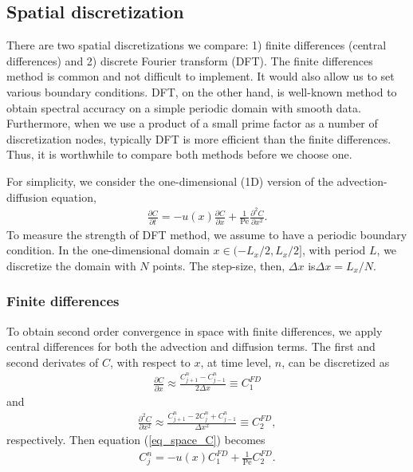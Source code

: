 \subsection{Spatial discretization}
There are two spatial discretizations we compare: 1) finite differences (central differences) and 2) discrete Fourier transform (DFT). The finite differences method is common and not difficult to implement. 
It would also allow us to set various boundary conditions. DFT, on the other hand, is well-known method to obtain spectral accuracy on a simple periodic domain with smooth data. Furthermore, when we use a product of a small prime factor as a number of discretization nodes, typically DFT is more efficient than the finite differences. Thus, it is worthwhile to compare both methods before we choose one. 
\par
For simplicity, we consider the one-dimensional (1D) version of the advection-diffusion equation,
\begin{align}
	\frac{\partial C}{\partial t} = 
	- u(x) \frac{\partial C}{\partial x} 
	+ \frac{1}{\text{Pe}} \frac{\partial^2 C}{\partial x^2}.
	\label{eq_space_C}
\end{align}
To measure the strength of DFT method, we assume to have a periodic boundary condition. In the one-dimensional domain $x \in (-L_x/2, L_x/2]$, with period $L$, we discretize the domain with $N$ points. The step-size, then, $\Delta x$ is$ \Delta x = L_x/N$.
\subsubsection{Finite differences}
To obtain second order convergence in space with finite differences, we apply  central differences for both the advection and diffusion terms. The first and second derivates of $C$, with respect to $x$, at time level, $n$, can be discretized as \cite{olver_introduction_2014}
\begin{align}
	\frac{\partial C}{\partial x}  \approx
	 \frac{C_{j+1}^{n} - C_{ j-1}^{n}}{2 \Delta x}
	 \equiv C_1^{FD}
	 \label{eq_c1_fd}
\end{align}
and
\begin{align}
	 \frac{\partial^2 C}{\partial x^2} \approx
	 \frac{C_{ j+1}^n -2 C_{j}^n + C_{ j-1}^n}{\Delta x^2}
	  \equiv C_2^{FD},
	 \label{eq_c2_fd}
\end{align}
respectively. 
Then equation (\ref{eq_space_C}) becomes
\begin{align}
	 C_{j}^n
	=  -u(x) C_1^{FD} + \frac{1}{\text{Pe}} C_2^{FD}.
\end{align}
